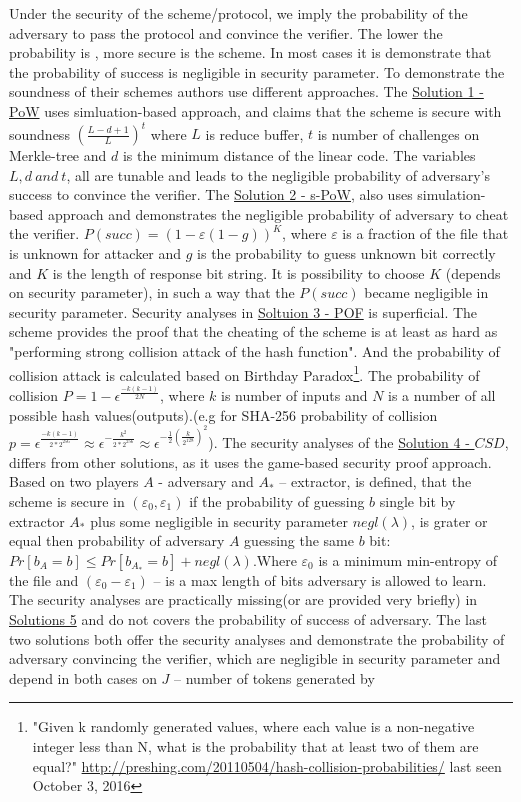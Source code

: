 \documentclass[12pt]{article}
\begin{document}
\noindent Under the security of the scheme/protocol, we imply the probability of the adversary to pass the protocol and convince the verifier. The lower the probability is , more secure is the scheme. In most cases it is demonstrate that the probability of success is negligible in security parameter. To demonstrate the soundness of their schemes authors use different approaches. The \hyperref[sub:Soltuion1] {Solution 1 - PoW} uses simluation-based approach, and claims that the scheme is secure with soundness  $\left( \frac{L-d+1}{L}\right)^t$ where $L$ is reduce buffer, $t$ is number of challenges on Merkle-tree and $d$ is the minimum distance of the linear code. The variables $L,d\ and\ t$, all are tunable and leads to the negligible probability of adversary's success to convince the verifier. The \hyperref[sub:Soltuion2] {Solution 2 - s-PoW}, also uses  simulation-based approach and demonstrates the negligible probability of adversary to cheat the verifier. $P(succ) = (1-\varepsilon(1-g))^K$, where $\varepsilon$ is a fraction of the file that is unknown for attacker and $g$ is the probability to guess unknown bit correctly and $K$ is the length of response bit string. It is possibility to choose $K$ (depends on security parameter), in such a way that the $P(succ)$ became negligible in security parameter. Security analyses in \hyperref[sub:Soltuion3]{Soltuion 3 - POF} is superficial. The scheme  provides the proof that the cheating of the scheme is at least as hard as "performing strong collision attack of the hash function". And the probability of collision attack is calculated based on Birthday Paradox\footnote{"Given k randomly generated values, where each value is a non-negative integer less than N, what is the probability that at least two of them are equal?" \url{http://preshing.com/20110504/hash-collision-probabilities/} last seen October 3, 2016}. The probability of collision $P=1- \epsilon^{\frac{-k(k-1)}{2N}}$, where $k$ is number of inputs and $N$ is a number of all possible hash values(outputs).(e.g for SHA-256 probability of collision $p=\epsilon^{\frac{-k(k-1)}{2* 2^{256}}}\approx\epsilon^{-\frac{k^2}{2* 2^{256}}}\approx\epsilon^{-\frac{1}{2}( \frac{k}{2^{128}})^2}$). The security analyses of the   \hyperref[sub:Soltuion4]{Solution 4 - $CSD$}, differs from other solutions, as it uses the game-based security proof approach. Based on  two players $A$ - adversary and $A_*$ -- extractor, is defined, that the scheme is secure in $(\varepsilon_0, \varepsilon_1)$ if the probability of guessing $b$ single bit by extractor $A_*$ plus some negligible in security parameter $negl(\lambda)$, is grater or equal then probability of adversary $A$ guessing the same $b$ bit: $Pr[b_A=b]\leq Pr[b_{A_*}=b]+negl(\lambda)$.Where $\varepsilon_0$ is a minimum min-entropy of the file and $(\varepsilon_0 - \varepsilon_1 )$ – is a max length of bits adversary is allowed to learn. The security analyses are practically missing(or are provided very briefly) in  \hyperref[sub:Soltuion5]{Solutions 5} and do not covers the probability of success of adversary. The last two solutions both offer the security analyses and demonstrate the probability of adversary convincing the verifier, which are negligible in security parameter and depend in both cases on $J$ -- number of tokens generated by 
\end{document}
